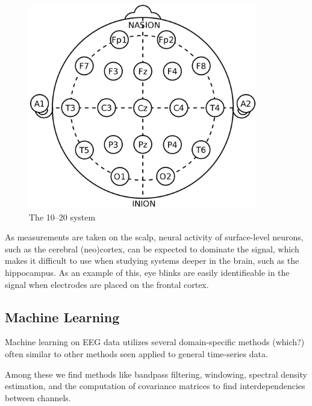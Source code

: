     \begin{figure}
        \begin{center}
            \includegraphics[width=10cm]{img/1020system.png}
        \end{center}
        \caption{The 10–20 system}\label{fig:1020}
    \end{figure}


    As measurements are taken on the scalp, neural activity of surface-level neurons, such as the cerebral (neo)cortex, can be expected to dominate the signal, which makes it difficult to use when studying systems deeper in the brain, such as the hippocampus. As an example of this, eye blinks are easily identifieable in the signal when electrodes are placed on the frontal cortex.



\subsection{Machine Learning}

    Machine learning on EEG data utilizes several domain-specific methods (which?) often similar to other methods seen applied to general time-series data.

    Among these we find methods like bandpass filtering, windowing, spectral density estimation, and the computation of covariance matrices to find interdependencies between channels.

